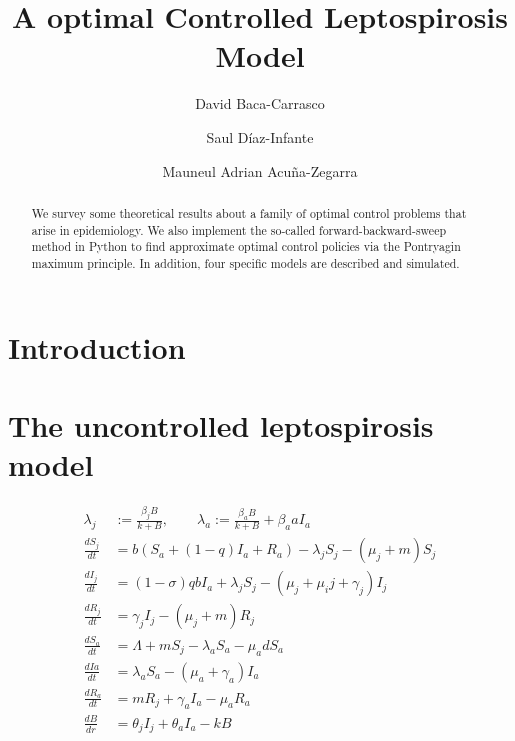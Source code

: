 \documentclass[11pt]{amsart}
\title[%
	A optimal Controlled Leptospirosis Model%
	]{
	A optimal Controlled Leptospirosis Model
}
\author[D. Baca]{David Baca-Carrasco}
\author[S. D\'iaz-Infante]{Saul D\'iaz-Infante}
\author[M.A. Acu\~{n}a]{Mauneul Adrian Acu\~{n}a-Zegarra}
\theoremstyle{definition}
\numberwithin{equation}{section}
\begin{document}
  \begin{abstract}
    We survey some theoretical results about a family of optimal 
    control problems that arise in epidemiology. We also implement the
    so-called forward-backward-sweep method in Python to find approximate
    optimal control policies via the Pontryagin maximum principle. 
    In addition, four specific models are described and simulated.
  \end{abstract}
\maketitle
%
  \section{Introduction}
 
  \section{The uncontrolled leptospirosis model}
      \begin{equation}
        \begin{aligned}
                \lambda_j &:= \frac{\beta_j B}{k + B}, \qquad
                \lambda_a := \frac{\beta_a B}{k + B} + \beta_aa I_a
                \\
                \frac{d S_j}{dt} &=
                    b (S_a + (1 - q) I_a + R_a)
                    -\lambda_{j} S_j - (\mu_j + m) S_j 
                \\
                \frac{d I_j}{dt} &=
                    (1 - \sigma)   q   b   I_a
                    + \lambda_j S_j - (\mu_j + \mu_ij + \gamma_j)I_j
                \\
                \frac{d R_j}{dt} &=
                    \gamma_j I_j - (\mu_j + m) R_j
                \\
                \frac{dS_a}{dt} &=
                    \Lambda + m S_j - \lambda_a S_a - \mu_a dS_a
                \\
                \frac{dIa}{dt} &=
                    \lambda_a S_a - (\mu_a + \gamma_a)   I_a
                \\
                \frac{dR_a}{dt} &=
                    m R_j + \gamma_a I_a - \mu_a R_a
                \\
                \frac{dB}{dr} &=
                    \theta_j I_j + \theta_a I_a - k B
           \end{aligned}
      \end{equation}
\end{document}
